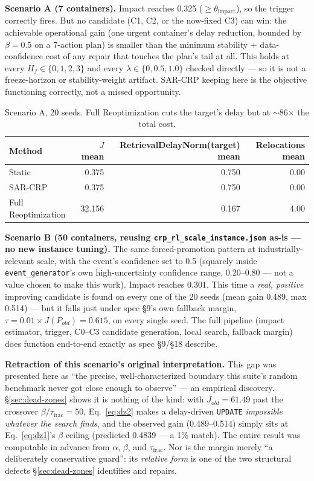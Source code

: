 \documentclass[11pt]{article}
\begin{document}
\textbf{Scenario A (7 containers).} Impact reaches 0.325 ($\ge\theta_{\text{impact}}$),
so the trigger correctly fires. But no candidate (C1, C2, or the now-fixed
C3) can win: the achievable operational gain (one urgent container's delay
reduction, bounded by $\beta=0.5$ on a 7-action plan) is smaller than the
minimum stability + data-confidence cost of any repair that touches the
plan's tail at all. This holds at every $H_f\in\{0,1,2,3\}$ and every
$\lambda\in\{0,0.5,1.0\}$ checked directly --- so it is not a freeze-horizon
or stability-weight artifact. SAR-CRP keeping here is the objective
functioning correctly, not a missed opportunity.

\begin{table}[h]
\centering
\small
\begin{tabular}{lrrr}
\hline
Method & $J$ mean & RetrievalDelayNorm(target) mean & Relocations mean \\
\hline
Static & 0.375 & 0.750 & 0.00 \\
SAR-CRP & 0.375 & 0.750 & 0.00 \\
Full Reoptimization & 32.156 & 0.167 & 4.00 \\
\hline
\end{tabular}
\caption{Scenario A, 20 seeds. Full Reoptimization cuts the target's delay but at $\sim$86$\times$ the total cost.}
\end{table}

\textbf{Scenario B (50 containers, reusing \texttt{crp\_rl\_scale\_instance.json}
as-is --- no new instance tuning).} The same forced-promotion pattern at
industrially-relevant scale, with the event's confidence set to 0.5 (squarely
inside \texttt{event\_generator}'s own high-uncertainty confidence range,
0.20--0.80 --- not a value chosen to make this work). Impact reaches 0.301.
This time a \emph{real, positive} improving candidate is found on every one
of the 20 seeds (mean gain 0.489, max 0.514) --- but it falls just under
spec \S9's own fallback margin, $\tau = 0.01 \times J(P_{old}) = 0.615$, on
every single seed. The full pipeline (impact estimator, trigger, C0--C3
candidate generation, local search, fallback margin) does function
end-to-end exactly as spec \S9/\S18 describe.

\textbf{Retraction of this scenario's original interpretation.} This gap
was presented here as ``the precise, well-characterized boundary this
suite's random benchmark never got close enough to observe'' --- an
empirical discovery. \S\ref{sec:dead-zones} shows it is nothing of the
kind: with $J_{old} = 61.49$ past the crossover
$\beta/\tau_{\text{frac}} = 50$, Eq.~\ref{eq:dz2} makes a delay-driven
\texttt{UPDATE} \emph{impossible whatever the search finds}, and the
observed gain (0.489--0.514) simply sits at Eq.~\ref{eq:dz1}'s $\beta$
ceiling (predicted 0.4839 --- a 1\% match). The entire result was
computable in advance from $\alpha$, $\beta$, and $\tau_{\text{frac}}$.
Nor is the margin merely ``a deliberately conservative guard'': its
\emph{relative form} is one of the two structural defects
\S\ref{sec:dead-zones} identifies and repairs.
\end{document}
